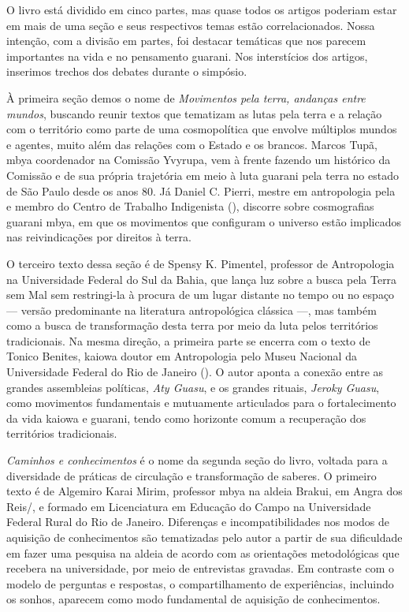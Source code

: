 O livro está dividido em cinco partes, mas quase todos os artigos
poderiam estar em mais de uma seção e seus respectivos temas estão
correlacionados. Nossa intenção, com a divisão em partes, foi destacar
temáticas que nos parecem importantes na vida e no pensamento guarani.
Nos interstícios dos artigos, inserimos trechos dos debates durante o
simpósio.

À primeira seção demos o nome de \emph{Movimentos pela terra, andanças entre
mundos}, buscando reunir textos que tematizam as lutas pela terra e a
relação com o território como parte de uma cosmopolítica que envolve
múltiplos mundos e agentes, muito além das relações com o Estado e os
brancos. Marcos Tupã, mbya coordenador na Comissão Yvyrupa, vem à
frente fazendo um histórico da Comissão e de sua própria trajetória em
meio à luta guarani pela terra no estado de São Paulo desde os anos 80.
Já Daniel C. Pierri, mestre em antropologia pela  e membro do Centro
de Trabalho Indigenista (), discorre sobre cosmografias guarani
mbya, em que os movimentos que configuram o universo estão implicados
nas reivindicações por direitos à terra.

O terceiro texto dessa seção é de Spensy K. Pimentel, professor de
Antropologia na Universidade Federal do Sul da Bahia, que lança luz
sobre a busca pela Terra sem Mal sem restringi-la à procura de um lugar
distante no tempo ou no espaço --- versão predominante na literatura
antropológica clássica ---, mas também como a busca de transformação
desta terra por meio da luta pelos territórios tradicionais. Na mesma
direção, a primeira parte se encerra com o texto de Tonico Benites,
kaiowa doutor em Antropologia pelo Museu Nacional da Universidade
Federal do Rio de Janeiro (). O autor aponta a conexão entre as
grandes assembleias políticas, \emph{Aty Guasu}, e os grandes rituais, \emph{Jeroky
Guasu}, como movimentos fundamentais e mutuamente articulados para o
fortalecimento da vida kaiowa e guarani, tendo como horizonte comum a
recuperação dos territórios tradicionais.

\emph{Caminhos e conhecimentos} é o nome da segunda seção do livro, voltada
para a diversidade de práticas de circulação e transformação de
saberes. O primeiro texto é de Algemiro Karai Mirim, professor mbya na
aldeia Brakui, em Angra dos Reis/, e formado em Licenciatura em
Educação do Campo na Universidade Federal Rural do Rio de Janeiro.
Diferenças e incompatibilidades nos modos de aquisição de conhecimentos
são tematizadas pelo autor a partir de sua dificuldade em fazer uma
pesquisa na aldeia de acordo com as orientações metodológicas que
recebera na universidade, por meio de entrevistas gravadas. Em
contraste com o modelo de perguntas e respostas, o compartilhamento de
experiências, incluindo os sonhos, aparecem como modo fundamental de
aquisição de conhecimentos. 

